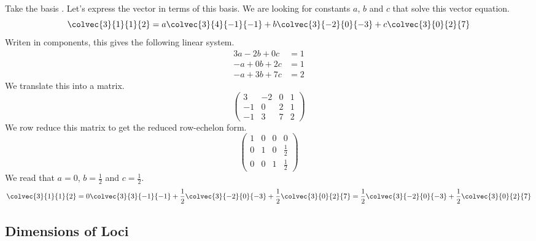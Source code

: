 \documentclass[fleqn]{report}
\begin{document}
\begin{example}
Take the basis . Let's
express the vector  in
terms of this basis. We are looking for constants $a$, $b$ and
$c$ that solve this vector equation.
\begin{equation*}
\colvec{3}{1}{1}{2} = a \colvec{3}{4}{-1}{-1} + b
\colvec{3}{-2}{0}{-3} + c \colvec{3}{0}{2}{7} 
\end{equation*} 
Writen in components, this gives the following linear system.
\begin{align*}
3a - 2b + 0c & = 1 \\
-a + 0b + 2c & = 1 \\
-a + 3b + 7c & = 2
\end{align*}
We translate this into a matrix.
\begin{equation*}
\left( 
\begin{array}{ccc|c}
3 & -2 & 0 & 1 \\
-1 & 0 & 2 & 1 \\
-1 & 3 & 7 & 2 
\end{array}
\right)
\end{equation*}
We row reduce this matrix to get the reduced row-echelon
form.
\begin{equation*}
\left( 
\begin{array}{ccc|c}
1 & 0 & 0 & 0 \\
0 & 1 & 0 & \frac{1}{2} \\
0 & 0 & 1 & \frac{1}{2}
\end{array}
\right)
\end{equation*}
We read that $a=0$, $b=\frac{1}{2}$ and $c = \frac{1}{2}$.
\begin{equation*}
\colvec{3}{1}{1}{2} = 0 \colvec{3}{3}{-1}{-1} + \frac{1}{2}
\colvec{3}{-2}{0}{-3} + \frac{1}{2} \colvec{3}{0}{2}{7} = 
\frac{1}{2} \colvec{3}{-2}{0}{-3} + \frac{1}{2}
\colvec{3}{0}{2}{7} 
\end{equation*} 
\end{example}

\subsection{Dimensions of Loci}
\label{dimensions-of-loci}
\end{document}
